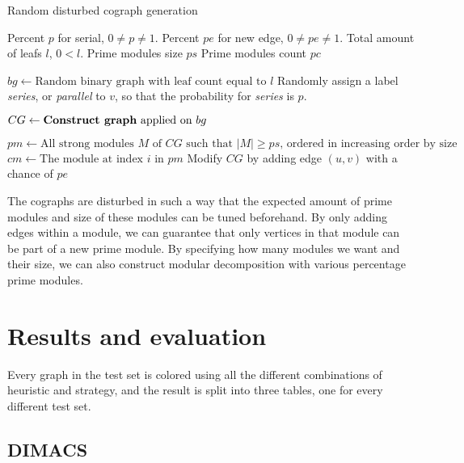 \documentclass{amsart}
\begin{document}
\begin{algorithm}[H]
    \caption{Random disturbed cograph generation}
  \label{alg:RDCG}
  \begin{algorithmic}[1]
      \REQUIRE Percent $p$ for serial, $0 \neq p \neq 1$.
      \REQUIRE Percent $pe$ for new  edge, $0 \neq pe \neq 1$.
      \REQUIRE Total amount of leafs $l$, $0 < l$.
      \REQUIRE Prime modules size $ps$
      \REQUIRE Prime modules count $pc$

      \STATE $bg \leftarrow \text{Random binary graph with leaf count equal to $l$}$
        \STATE Randomly assign a label  \textit{series}, or \textit{parallel} to $v$, so
        that the probability for \textit{series} is $p$.
      \ENDFOR

      \STATE $CG \leftarrow \text{\textbf{Construct graph} applied on $bg$}$

      \STATE $pm \leftarrow \text{All strong modules $M$ of $CG$ such that $|M| \geq ps$, ordered in increasing order by size}$
        \STATE $cm \leftarrow \text{The module at index $i$ in $pm$}$
            \STATE Modify $CG$ by adding edge $(u,v)$ with a chance of $pe$
        \ENDFOR
      \ENDFOR
  \end{algorithmic}
\end{algorithm}

The cographs are disturbed in such a way that the expected amount of prime
modules and size of these modules can be tuned beforehand. By only adding edges
within a module, we can guarantee that only vertices in that module can be part
of a new prime module. By specifying how many modules we want and their size, we
can also construct modular decomposition with various percentage prime modules.


\section{Results and evaluation}
\label{sec:Result}
Every graph in the test set is colored using all the different combinations
of heuristic and strategy, and the result is split into three tables, one for
every different test set.

\subsection{DIMACS}

\end{document}
